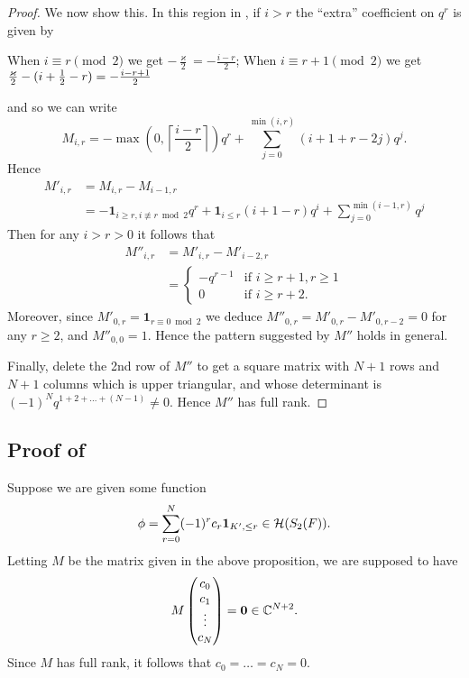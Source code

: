 \begin{proof}
  We now show this.
  In this region in , if $i > r$
  the ``extra'' coefficient on $q^r$ is given by
  \begin{itemize}
    \ii When $i \equiv r \pmod 2$ we get $-\frac{\varkappa}{2} = - \frac{i-r}{2}$;
    \ii When $i \equiv r+1 \pmod 2$ we get $\frac{\varkappa}{2} - (i + \frac{1}{2} - r) = -\frac{i-r+1}{2}$
  \end{itemize}
  and so we can write
  \[
    M_{i,r}
    = - \max\left(0, \left\lceil \frac{i-r}{2} \right\rceil \right) q^{r}
    + \sum_{j=0}^{\min(i,r)} \left( i + 1 + r - 2j \right) q^j.
  \]
  Hence
  \begin{align*}
    M'_{i,r}
    &= M_{i,r} - M_{i-1,r} \\
    &= - \mathbf{1}_{i \ge r, i \not\equiv r \bmod 2} q^r
    + \mathbf{1}_{i \le r} (i+1-r) q^i
    + \sum_{j=0}^{\min(i-1,r)} q^j
  \end{align*}
  Then for any $i > r > 0$ it follows that
  \begin{align*}
    M''_{i,r}
    &= M'_{i,r} - M'_{i-2,r} \\
    &= \begin{cases}
      -q^{r-1} & \text{if } i \ge r+1, r \ge 1 \\
      0 & \text{if } i \ge r+2.
    \end{cases}
  \end{align*}
  Moreover, since $M'_{0,r} = \mathbf{1}_{r \equiv 0 \bmod 2}$
  we deduce
  $M''_{0,r} = M'_{0,r} - M'_{0,r-2} = 0$
  for any $r \ge 2$, and $M''_{0,0} = 1$.
  Hence the pattern suggested by $M''$ holds in general.

  Finally, delete the 2nd row of $M''$ to get a square matrix
  with $N+1$ rows and $N+1$ columns which is upper triangular,
  and whose determinant is $(-1)^N q^{1+2+\dots+(N-1)} \neq 0$.
  Hence $M''$ has full rank.
\end{proof}

\subsection{Proof of }
Suppose we are given some function
\[ \phi = \sum_{r=0}^N (-1)^r c_r \mathbf{1}_{K', \le r} \in \mathcal H(S_2(F)). \]
Letting $M$ be the matrix given in the above proposition, we are supposed to have
\[
  M \begin{pmatrix} c_0 \\ c_1 \\ \vdots \\ c_N \end{pmatrix}
  = \mathbf{0} \in \mathbb C^{N+2}.
\]
Since $M$ has full rank, it follows that $c_0 = \dots = c_N = 0$.

